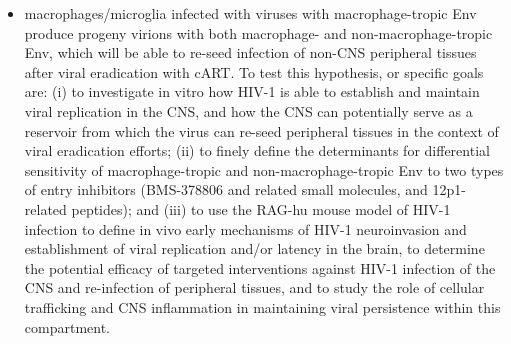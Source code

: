 \documentclass[a4paper,11pt]{article}
\makeatletter
\newenvironment{fullwidth}
    {\par
     \setlength{\@totalleftmargin}{0pt}%
     \setlength{\linewidth}{\hsize}%
     \list{}{\setlength{\leftmargin}{0pt}}
     \item\relax}
    {\endlist}
\makeatother
\begin{document}
\begin{enumerate}
\begin{itemize}
\begin{fullwidth}
macrophages/microglia infected with viruses with macrophage-tropic Env produce progeny virions with both macrophage- and non-macrophage-tropic Env, which will be able to re-seed infection of non-CNS peripheral tissues after viral eradication with cART. To test this hypothesis, or specific goals are: (i) to investigate in vitro how HIV-1 is able to establish and maintain viral replication in the CNS, and how the CNS can potentially serve as a reservoir from which the virus can re-seed peripheral tissues in the context of viral eradication efforts; (ii) to finely define the determinants for differential sensitivity of macrophage-tropic and non-macrophage-tropic Env to two types of entry inhibitors (BMS-378806 and related small molecules, and 12p1-related peptides); and (iii) to use the RAG-hu mouse model of HIV-1 infection to define in vivo early mechanisms of HIV-1 neuroinvasion and establishment of viral replication and/or latency in the brain, to determine the potential efficacy of targeted interventions against HIV-1 infection of the CNS and re-infection of peripheral tissues, and to study the role of cellular trafficking and CNS inflammation in maintaining viral persistence within this compartment.
    \end{fullwidth}
  

\end{itemize}
\end{enumerate}
\end{document}
